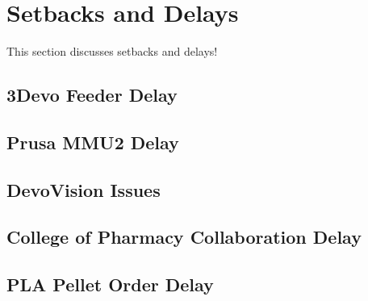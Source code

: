 \section{Setbacks and Delays\label{discussion:setbacks}}
This section discusses setbacks and delays!


\subsection{3Devo Feeder Delay\label{sec:discussion:setbacks:3devoFeederDelay}}

\subsection{Prusa MMU2 Delay\label{sec:discussion:setbacks:prusaMMU2Delay}}

\subsection{DevoVision Issues\label{sec:discussion:setbacks:devoVisionIssues}}

\subsection{College of Pharmacy Collaboration Delay\label{sec:discussion:setbacks:pharmacyCollaborationDelay}}

\subsection{PLA Pellet Order Delay\label{sec:discussion:setbacks:plaPelletOrderDelay}}
